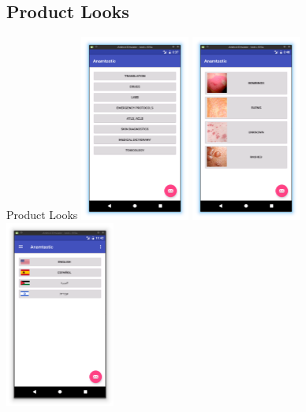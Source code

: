 \documentclass[presentation]{beamer}
\begin{document}
\subsection{Product Looks}
\label{sec-1-3}
\begin{frame}[label=sec-1-3-1]{Product Looks}
\includegraphics[width=3.6cm]{./presentation-images/module-selection-menu.png}
\includegraphics[width=3.6cm]{./presentation-images/skin-diagnostic-menu.png}
\includegraphics[width=3.6cm]{./presentation-images/language-select-menu.png}
\end{frame}
\end{document}
